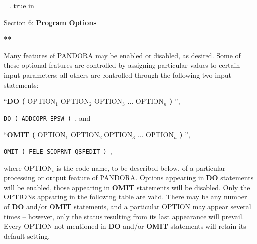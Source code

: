 %
\newtoks\footline \footline={\hss{}.\folio\hss}
\def\bang{\par \hangindent=10pt \hangafter=0}
\top
{} true in
\centerline{Section 6: {\bf Program Options}}
\blankline
\blankline
\centerline{\bf ***}
\blankline
\blankline
Many features of PANDORA may be enabled or disabled, as desired. Some of
these optional features are controlled by assigning particular values to
certain input parameters; all others are controlled through the following
two input statements: \par
\centerline{``{\bf DO ( } OPTION$_1$ OPTION$_2$ OPTION$_3$ 
$\ldots$ OPTION$_n$ {\bf ) }'',}
 {\tt DO ( ADDCOPR EPSW ) }, and \par
\centerline{``{\bf OMIT ( } OPTION$_1$ OPTION$_2$ OPTION$_3$ 
$\ldots$ OPTION$_n$ {\bf ) }'',}
 {\tt OMIT ( FELE SCOPRNT QSFEDIT ) }, \par
\noindent where OPTION$_i$ is the {\alfa} code name, to be described below,
of a particular processing or output feature of PANDORA. Options appearing
in {\bf DO} statements will be enabled, those appearing in {\bf OMIT}
statements will be disabled. Only the OPTIONs appearing in the following
table are valid. There may be any number of {\bf DO} and/or {\bf OMIT}
statements, and a particular OPTION may appear several times --
however, only the status resulting from its last appearance will prevail.
Every OPTION not mentioned in {\bf DO} and/or {\bf OMIT} statements
will retain its default setting.

